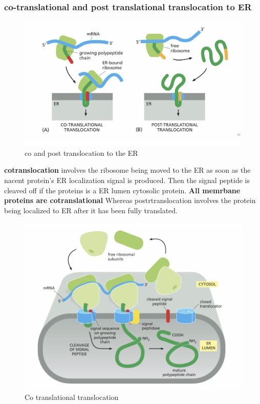 \documentclass[../main.tex]{subfiles}
\begin{document}
\subsubsection{co-translational and post translational translocation to ER}
\begin{figure}[H]
    \centering
    \includegraphics[width=1\linewidth]{CoTranslation.png}
    \caption{co and post translocation to the ER}
    \label{fig:enter-label}
\end{figure}

\textbf{\gls{cotranslocation}} involves the ribosome being moved to the ER as soon as the nacent protein's ER localization signal is produced. Then the signal peptide is cleaved off if the proteins is a ER lumen cytosolic protein. \textbf{All memrbane proteins are cotranslational} Whereas \gls{postrtranslocation} involves the protein being localized to ER after it has been fully translated.
\begin{figure}[H]
    \centering
    \includegraphics[width=0.5\linewidth]{Sum_Cell_Bio_II//lectures//cbII4/cotranslation.png}
    \caption{Co translational translocation}
    \label{fig:enter-label}
\end{figure}
\end{document}
